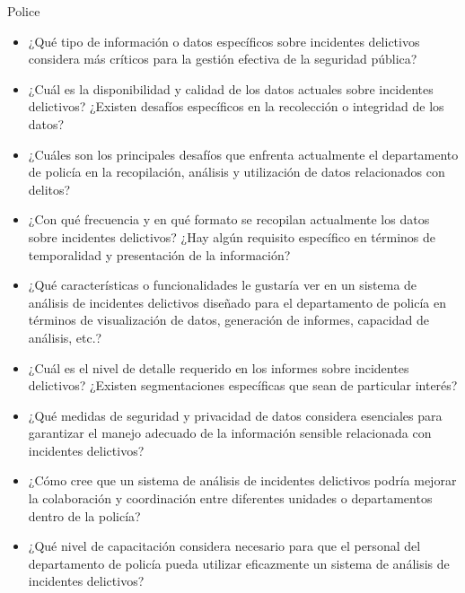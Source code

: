 Police
\begin{itemize}
    \item ¿Qué tipo de información o datos específicos sobre incidentes delictivos considera más críticos para la gestión efectiva de la seguridad pública?
    \item ¿Cuál es la disponibilidad y calidad de los datos actuales sobre incidentes delictivos? ¿Existen desafíos específicos en la recolección o integridad de los datos?
    \item ¿Cuáles son los principales desafíos que enfrenta actualmente el departamento de policía en la recopilación, análisis y utilización de datos relacionados con delitos?
    \item ¿Con qué frecuencia y en qué formato se recopilan actualmente los datos sobre incidentes delictivos? ¿Hay algún requisito específico en términos de temporalidad y presentación de la información?
    \item ¿Qué características o funcionalidades le gustaría ver en un sistema de análisis de incidentes delictivos diseñado para el departamento de policía en términos de visualización de datos, generación de informes, capacidad de análisis, etc.?
    \item ¿Cuál es el nivel de detalle requerido en los informes sobre incidentes delictivos? ¿Existen segmentaciones específicas que sean de particular interés?
    \item ¿Qué medidas de seguridad y privacidad de datos considera esenciales para garantizar el manejo adecuado de la información sensible relacionada con incidentes delictivos?
    \item ¿Cómo cree que un sistema de análisis de incidentes delictivos podría mejorar la colaboración y coordinación entre diferentes unidades o departamentos dentro de la policía?
    \item ¿Qué nivel de capacitación considera necesario para que el personal del departamento de policía pueda utilizar eficazmente un sistema de análisis de incidentes delictivos?
\end{itemize}


